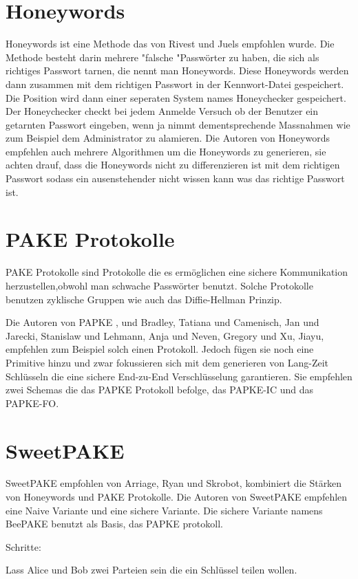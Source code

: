 \documentclass[conference, compsoc]{IEEEtran}
\begin{document}
\section{Honeywords}
Honeywords ist eine Methode das von Rivest und Juels empfohlen
wurde\cite{juels2013honeywords}. Die Methode besteht darin mehrere "falsche
"Passwörter zu haben, die sich als richtiges Passwort tarnen, die nennt man
Honeywords. Diese Honeywords werden dann zusammen mit dem richtigen Passwort in
der Kennwort-Datei gespeichert. Die Position wird dann einer seperaten System
names Honeychecker gespeichert. Der Honeychecker checkt bei jedem Anmelde
Versuch ob der Benutzer ein getarnten Passwort eingeben, wenn ja nimmt
dementsprechende Massnahmen wie zum Beispiel dem Administrator zu alamieren. 
Die Autoren von Honeywords empfehlen auch mehrere Algorithmen um die Honeywords
zu generieren, sie achten drauf, dass die Honeywords nicht zu differenzieren ist
mit dem richtigen Passwort sodass ein ausenstehender nicht wissen kann was das
richtige Passwort ist.

\section{PAKE Protokolle}
PAKE Protokolle sind Protokolle die es ermöglichen eine sichere Kommunikation
herzustellen,obwohl man schwache Passwörter benutzt. Solche Protokolle benutzen
zyklische Gruppen wie auch das Diffie-Hellman Prinzip.

Die Autoren von PAPKE \cite{bradley2019password}, und Bradley, Tatiana und
Camenisch, Jan und Jarecki, Stanislaw und Lehmann, Anja und Neven, Gregory und
Xu, Jiayu, empfehlen zum Beispiel solch einen Protokoll. Jedoch fügen sie noch
eine Primitive hinzu und zwar fokussieren sich mit dem generieren von Lang-Zeit
Schlüsseln die eine sichere End-zu-End Verschlüsselung garantieren. Sie
empfehlen zwei Schemas die das PAPKE Protokoll befolge, das PAPKE-IC und das
PAPKE-FO.

\section{SweetPAKE}
SweetPAKE empfohlen von Arriage, Ryan und Skrobot, kombiniert die Stärken
von Honeywords und PAKE Protokolle. Die Autoren von SweetPAKE empfehlen
eine Naive Variante und eine sichere Variante. Die sichere Variante namens 
BeePAKE benutzt als Basis, das PAPKE protokoll.

Schritte:

Lass Alice und Bob zwei Parteien sein die ein Schlüssel teilen wollen.
\end{document}
